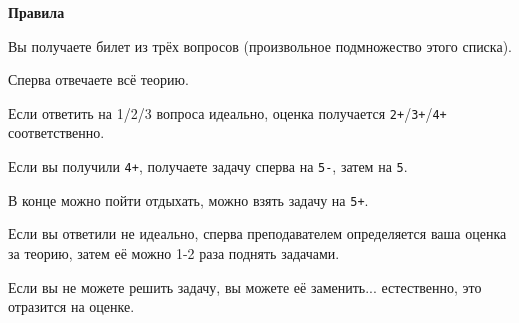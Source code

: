 \documentclass[11pt]{article}
\def\t{\texttt}          %
\def\Header#1{
  \vspace*{0.1em}
  {\color{blue} \large \bf #1}
  \vspace*{0.2em}
}
\begin{document}
\Header{Правила}

\vspace*{0.5em}\hspace*{-2em}\parbox{17cm}{
Вы получаете билет из трёх вопросов (произвольное подмножество этого списка).

Сперва отвечаете всё теорию. 

Если ответить на 1/2/3 вопроса идеально, оценка получается \t{2+}/\t{3+}/\t{4+} соответственно.

Если вы получили \t{4+}, получаете задачу сперва на \t{5-}, затем на \t{5}.

В конце можно пойти отдыхать, можно взять задачу на \t{5+}.

Если вы ответили не идеально, сперва преподавателем определяется ваша оценка за теорию, затем её можно 1-2 раза поднять задачами.

Если вы не можете решить задачу, вы можете её заменить... естественно, это отразится на оценке.
}
\end{document}
